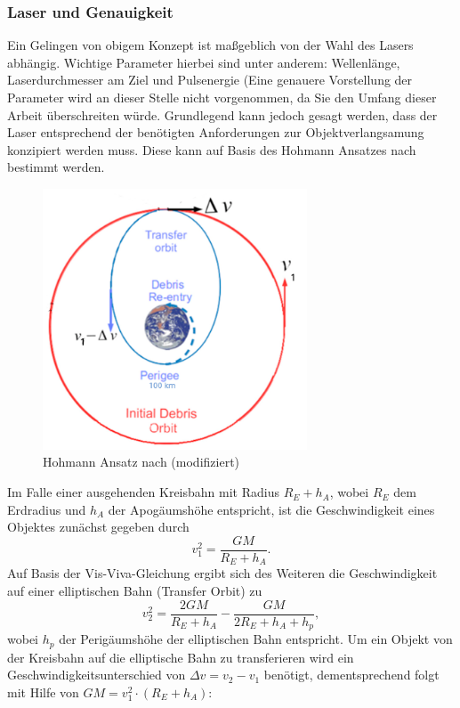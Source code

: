 \documentclass{article}
\begin{document}
\subsubsection{Laser und Genauigkeit}
Ein Gelingen von obigem Konzept ist maßgeblich von der Wahl des Lasers abhängig. Wichtige Parameter hierbei sind unter anderem: Wellenlänge, Laserdurchmesser am Ziel und Pulsenergie (Eine genauere Vorstellung der Parameter wird an dieser Stelle nicht vorgenommen, da Sie den Umfang dieser Arbeit überschreiten würde. Grundlegend kann jedoch gesagt werden, dass der Laser entsprechend der benötigten Anforderungen zur Objektverlangsamung konzipiert werden muss. Diese kann auf Basis des Hohmann Ansatzes nach \citet{liedahl2013pulsed} bestimmt werden. 
\begin{figure}[H]
	\centering
	\includegraphics[width = 0.7\textwidth]{images/hohman mod.png}
	\caption{Hohmann Ansatz nach \citet{soulard2014ican} (modifiziert)}
	\label{htschema}
\end{figure}
\noindent
Im Falle einer ausgehenden Kreisbahn mit Radius $R_E+h_A$, wobei $R_E$ dem Erdradius und $h_A$ der Apogäumshöhe entspricht, ist die Geschwindigkeit eines Objektes zunächst gegeben durch
\begin{equation}
	\label{kbspeed}
	v_1^2=\frac{G M}{R_E+h_A}.
\end{equation}
\noindent
Auf Basis der Vis-Viva-Gleichung ergibt sich des Weiteren die Geschwindigkeit auf einer elliptischen Bahn (Transfer Orbit) zu
\begin{equation}
	\label{zweispeed}
	v_2^2=\frac{2 G M}{R_E+h_A}-\frac{G M}{2R_E+h_A+h_p},
\end{equation}
\noindent
wobei $h_p$ der Perigäumshöhe der elliptischen Bahn entspricht. Um ein Objekt von der Kreisbahn auf die elliptische Bahn zu transferieren wird ein Geschwindigkeitsunterschied von $\Delta v = v_2 - v_1$ benötigt, dementsprechend folgt mit Hilfe von $GM=v_1^2\cdot (R_E+h_A)$:
\end{document}
